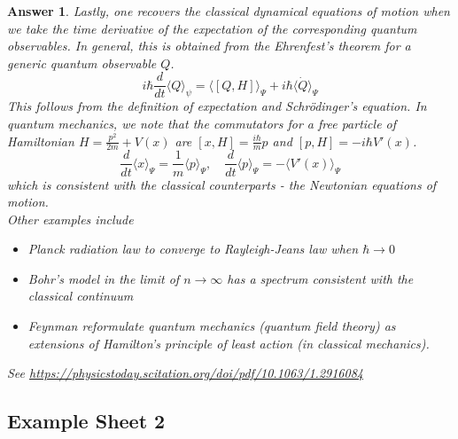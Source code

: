 \documentclass[a4paper]{article}
\newtheorem{ans}{Answer}[section]
\theoremstyle{new}
\begin{document}
\begin{ans}
Lastly, one recovers the classical dynamical equations of motion when we take the time derivative of the expectation of the corresponding quantum observables. In general, this is obtained from the Ehrenfest's theorem for a generic quantum observable $Q$. 
$$i\hbar\frac{d}{dt}\langle Q\rangle_\psi=\langle [Q,H]\rangle_\Psi+i\hbar\langle\dot{Q}\rangle_\Psi$$
This follows from the definition of expectation and Schr\"{o}dinger's equation. In quantum mechanics, we note that the commutators for a free particle of Hamiltonian $H=\frac{p^2}{2m}+V(x)$ are $[x,H]=\frac{i\hbar}{m}p$ and $[p,H]=-i\hbar V'(x)$.
$$\frac{d}{dt}\langle x\rangle_\Psi=\frac{1}{m}\langle p\rangle_\Psi,\quad\frac{d}{dt}\langle p\rangle_\Psi=-\langle V'(x)\rangle_\Psi$$
which is consistent with the classical counterparts - the Newtonian equations of motion. \\[5pt]
Other examples include
\begin{itemize}
    \item Planck radiation law to converge to Rayleigh-Jeans law when $\hbar\rightarrow 0$
    \item Bohr's model in the limit of $n\rightarrow\infty$ has a spectrum consistent with the classical continuum
    \item Feynman reformulate quantum mechanics (quantum field theory) as extensions of Hamilton's principle of least action (in classical mechanics).
\end{itemize}
See \url{https://physicstoday.scitation.org/doi/pdf/10.1063/1.2916084}
\end{ans}
\newpage
\subsection{Example Sheet 2}
\end{document}
